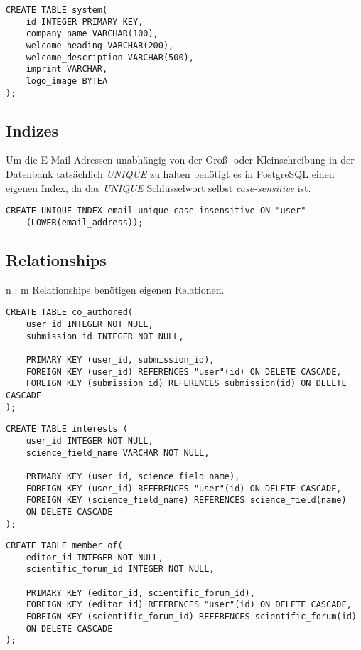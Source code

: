 \begin{lstlisting}[caption={DDL von den Systemeinstellungen}]
CREATE TABLE system(
	id INTEGER PRIMARY KEY,
	company_name VARCHAR(100),
	welcome_heading VARCHAR(200),
	welcome_description VARCHAR(500),
	imprint VARCHAR,
	logo_image BYTEA
);
\end{lstlisting}

\subsection{Indizes}

Um die E-Mail-Adressen unabhängig von der Groß- oder Kleinschreibung in der Datenbank tatsächlich \emph{UNIQUE} zu halten benötigt es in PostgreSQL einen eigenen Index, da das \emph{UNIQUE} Schlüsselwort selbst \emph{case-sensitive} ist.\\

\begin{lstlisting}[caption={DDL des UNIQUE Index auf E-Mail-Adressen}]
CREATE UNIQUE INDEX email_unique_case_insensitive ON "user"
	(LOWER(email_address));
\end{lstlisting}

\subsection{Relationships}

n : m Relationships benötigen eigenen Relationen.\\

\begin{lstlisting}[caption={DDL der Ko-Autoren}]
CREATE TABLE co_authored(
	user_id INTEGER NOT NULL,
	submission_id INTEGER NOT NULL,

	PRIMARY KEY (user_id, submission_id),
	FOREIGN KEY (user_id) REFERENCES "user"(id) ON DELETE CASCADE,
	FOREIGN KEY (submission_id) REFERENCES submission(id) ON DELETE CASCADE
);
\end{lstlisting}

\begin{lstlisting}[caption={DDL der Interessensgebiete}]
CREATE TABLE interests (
	user_id INTEGER NOT NULL,
	science_field_name VARCHAR NOT NULL,

	PRIMARY KEY (user_id, science_field_name),
	FOREIGN KEY (user_id) REFERENCES "user"(id) ON DELETE CASCADE,
	FOREIGN KEY (science_field_name) REFERENCES science_field(name)
	ON DELETE CASCADE
);
\end{lstlisting}

\begin{lstlisting}[caption={DDL der verwaltenden Editoren}]
CREATE TABLE member_of(
	editor_id INTEGER NOT NULL,
	scientific_forum_id INTEGER NOT NULL,

	PRIMARY KEY (editor_id, scientific_forum_id),
	FOREIGN KEY (editor_id) REFERENCES "user"(id) ON DELETE CASCADE,
	FOREIGN KEY (scientific_forum_id) REFERENCES scientific_forum(id)
	ON DELETE CASCADE
);
\end{lstlisting}

